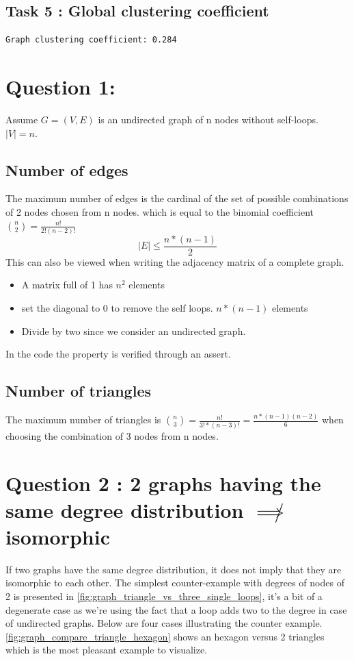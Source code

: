 \documentclass[a4paper]{article}
\begin{document}
\subsection*{Task 5 : Global clustering coefficient}
\begin{verbatim}
Graph clustering coefficient: 0.284
\end{verbatim}


\section{Question 1:}
Assume $G = (V, E)$ is an undirected graph of n nodes without self-loops. $|V|=n$.
\subsection*{Number of edges}
The maximum number of edges is the cardinal of the set of possible combinations of 2 nodes chosen from n nodes.
which is equal to the binomial coefficient $\binom{n}{2} = \frac{n!}{2! (n-2)!}$
\begin{equation}\label{eq 1.1}
|E| \leq \frac{n*(n-1)}{2}
\end{equation}
This can also be viewed when writing the adjacency matrix of a complete graph.
\begin{itemize}
    \item  A matrix full of 1 has $n^2$ elements
    \item set the diagonal to 0 to remove the self loops. $n*(n-1)$ elements
    \item Divide by two since we consider an undirected graph.
\end{itemize}


In the code the property is verified through an assert.

\subsection*{Number of triangles}
The maximum number of triangles is $\binom{n}{3} = \frac{n!}{3! * (n-3)!} = \frac{n*(n-1)(n-2)}{6}$ 
when choosing the combination of 3 nodes from n nodes.


\section{Question 2 : 2 graphs having the same degree distribution $\not \implies$ isomorphic}

If two graphs have the same degree distribution, it does not imply that they are isomorphic to each other.
The simplest counter-example with degrees of nodes of 2 is presented 
in \ref{fig:graph_triangle_vs_three_single_loops},
it's a bit of a degenerate case as we're using the fact that a loop adds two to the degree in case of undirected graphs.
Below are four cases illustrating the counter example.
\ref{fig:graph_compare_triangle_hexagon} shows an hexagon versus 2 triangles 
which is the most pleasant example to visualize.
\end{document}

